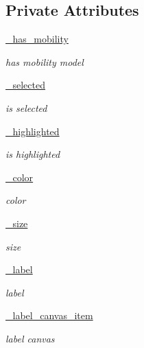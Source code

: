 \subsection*{Private Attributes}
\begin{DoxyCompactItemize}
\item 
\hyperlink{classvisualizer_1_1core_1_1Node_a9aaba352d2aad9fab82bae77f94fa3b0}{\+\_\+has\+\_\+mobility}
\begin{DoxyCompactList}\small\item\em has mobility model \end{DoxyCompactList}\item 
\hyperlink{classvisualizer_1_1core_1_1Node_ac2b143f96d540397a68636906e955778}{\+\_\+selected}
\begin{DoxyCompactList}\small\item\em is selected \end{DoxyCompactList}\item 
\hyperlink{classvisualizer_1_1core_1_1Node_a3cd0423bbc9b73387157c06d4cd9eb29}{\+\_\+highlighted}
\begin{DoxyCompactList}\small\item\em is highlighted \end{DoxyCompactList}\item 
\hyperlink{classvisualizer_1_1core_1_1Node_aa6fa6cdf104826e54e8ca1358df12f24}{\+\_\+color}
\begin{DoxyCompactList}\small\item\em color \end{DoxyCompactList}\item 
\hyperlink{classvisualizer_1_1core_1_1Node_a5fe791047714d82b5a798b72833bed40}{\+\_\+size}
\begin{DoxyCompactList}\small\item\em size \end{DoxyCompactList}\item 
\hyperlink{classvisualizer_1_1core_1_1Node_a660d23d39d781ab142f12f329690d018}{\+\_\+label}
\begin{DoxyCompactList}\small\item\em label \end{DoxyCompactList}\item 
\hyperlink{classvisualizer_1_1core_1_1Node_a44add8bc589dc3ff89f0bf26fa2db201}{\+\_\+label\+\_\+canvas\+\_\+item}
\begin{DoxyCompactList}\small\item\em label canvas \end{DoxyCompactList}\end{DoxyCompactItemize}
